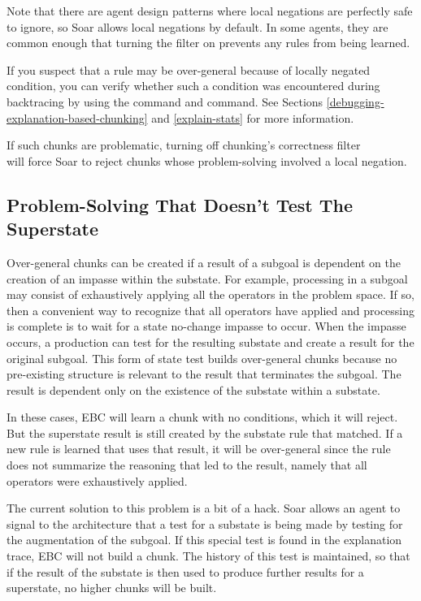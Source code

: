Note that there are agent design patterns where local negations are perfectly safe to ignore, so Soar allows local negations by default.  In some agents, they are common enough that turning the filter on prevents any rules from being learned.  

If you suspect that a rule may be over-general because of locally negated condition, you can verify whether such a condition was encountered during backtracing by using the  command and  command.  See Sections \ref{debugging-explanation-based-chunking} and \ref{explain-stats} for more information.  

If such chunks are problematic, turning off chunking's correctness filter \\
 will force Soar to reject chunks whose problem-solving involved a local negation. 

\subsection{Problem-Solving That Doesn't Test The Superstate}
\label{CHUNKING-correctness-issues-exhaustion}

Over-general chunks can be created if a result of a subgoal is dependent on the creation of an impasse within the substate. For example, processing in a subgoal may consist of exhaustively applying all the operators in the problem space. If so, then a convenient way to recognize that all operators have applied and processing is complete is to wait for a state no-change impasse to occur. When the impasse occurs, a production can test for the resulting substate and create a result for the original subgoal. This form of state test builds over-general chunks because no pre-existing structure is relevant to the result that terminates the subgoal. The result is dependent only on the existence of the substate within a substate.

In these cases, EBC will learn a chunk with no conditions, which it will reject.  But the superstate result is still created by the substate rule that matched.  If a new rule is learned that uses that result, it will be over-general since the rule does not summarize the reasoning that led to the result, namely that all operators were exhaustively applied. 

The current solution to this problem is a bit of a hack.  Soar allows an agent to signal to the architecture that a test for a substate is being made by testing for the  augmentation of the subgoal. If this special test is found in the explanation trace, EBC will not build a chunk. The history of this test is maintained, so that if the result of the substate is then used to produce further results for a superstate, no higher chunks will be built. 

